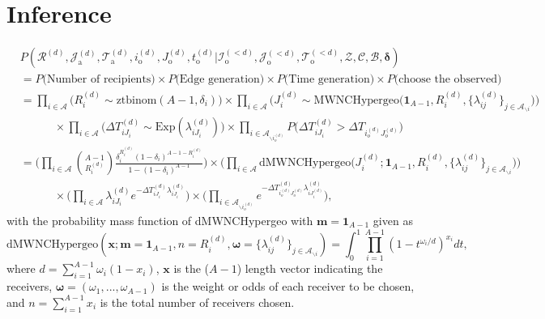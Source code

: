 \documentclass[a4paper]{article}
\begin{document}
\section{Inference}
\begin{equation}
\begin{aligned}
&P(\mathcal{R}^{(d)},\mathcal{J}^{(d)}_{\mbox{a}}, \mathcal{T}^{(d)}_{\mbox{a}}, i^{(d)}_{\mbox{o}}, J^{(d)}_{\mbox{o}}, t^{(d)}_{\mbox{o}} |\mathcal{I}^{(<d)}_{\mbox{o}}, \mathcal{J}^{(<d)}_{\mbox{o}}, \mathcal{T}^{(<d)}_{\mbox{o}}, \mathcal{Z}, \mathcal{C}, \mathcal{B}, \boldsymbol{\delta})\\&=P\Big(\mbox{Number of recipients}\Big) \times P\Big(\mbox{Edge generation}\Big)\times P\Big(\mbox{Time generation}\Big) \times P\Big(\mbox{choose the observed}\Big) \\&
=\prod_{i\in \mathcal{A}} \Big(R_i^{(d)} \sim \mbox{ztbinom}(A-1, \delta_i)\Big)\times
\prod_{i\in \mathcal{A}}\Big(J_i^{(d)}\sim \mbox{MWNCHypergeo}\Big(\mathbf{1}_{A-1}, R_i^{(d)}, \{\lambda_{ij}^{(d)}\}_{j \in \mathcal{A}_{\backslash i}} \Big)\Big) \\&\quad\quad\quad\times \prod_{i\in \mathcal{A}}\Big(\Delta T^{(d)}_{iJ_i}\sim\mbox{Exp}(\lambda^{(d)}_{iJ_i})\Big) \times \prod_{i\in \mathcal{A}_{\backslash i_o^{(d)}}} P\Big(\Delta T^{(d)}_{i{J_i}} > \Delta T_{i_{o}^{(d)}{J_{o}^{(d)}}}\Big)\\&=\Big(\prod_{i\in \mathcal{A}} {{A-1}\choose R_i^{(d)}} \frac{\delta_i^{ R_i^{(d)}} (1-\delta_i)^{A-1-R_i^{(d)}}}{1 - (1-\delta_i)^{A-1}}\Big) \times \Big(\prod_{i\in \mathcal{A}}\mbox{dMWNCHypergeo}\Big(J_i^{(d)}; \mathbf{1}_{A-1}, R_i^{(d)}, \{\lambda_{ij}^{(d)}\}_{j \in \mathcal{A}_{\backslash i}}\Big)\Big)\\&\quad\quad\quad
\times \Big(\prod_{i \in\mathcal{A}}\lambda^{(d)}_{iJ_i}e^{-\Delta T^{(d)}_{iJ_i}\lambda^{(d)}_{iJ_i}}\Big)\times \Big( \prod_{i\in \mathcal{A}_{\backslash i_o^{(d)}}} e^{-\Delta T^{(d)}_{i_o^{(d)}J_o^{(d)}}\lambda^{(d)}_{iJ^{(d)}_{i}}}\Big),
\end{aligned}
\end{equation}
with the probability mass function of dMWNCHypergeo with $\boldsymbol{m} =\mathbf{1}_{A-1}$ given as
\begin{equation*}
\mbox{dMWNCHypergeo}(\boldsymbol{x}; \boldsymbol{m} =\mathbf{1}_{A-1}, n = R_i^{(d)}, \boldsymbol{\omega} = \{\lambda_{ij}^{(d)}\}_{j \in \mathcal{A}_{\backslash i}}) = \int_0^1\prod_{i=1}^{A-1}(1-t^{\omega_i / d})^{x_i}dt,
\end{equation*}
where $d = \sum_{i = 1}^{A-1} \omega_i(1-x_i)$, $\boldsymbol{x}$ is the ($A-1$) length vector indicating the receivers, $\boldsymbol{\omega} =(\omega_1,...,\omega_{A-1})$ is the weight or odds of each receiver to be chosen, and $n = \sum_{i= 1} ^{A-1} x_i$ is the total number of receivers chosen. 
\end{document}
